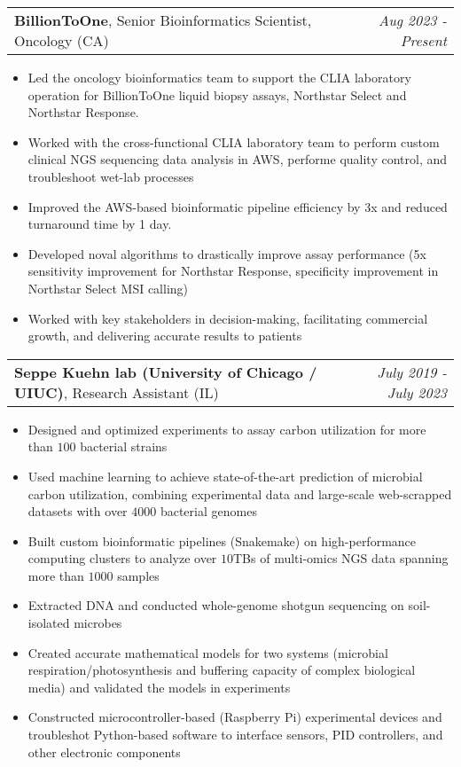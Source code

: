\documentclass[letterpaper,11pt]{article}
\makeatletter
\newcommand{\resumeItem}[2]{
  \item {#2\vspace{-2pt}} %
}
\newcommand{\resumeSubheading}[4]{
  \vspace{-1pt}\item[]
    \begin{tabular*}{0.97\textwidth}[t]{l@{\extracolsep{\fill}}r}
      \textbf{#1}, {#2} (#3) & \textit{#4} \\
    \end{tabular*}\vspace{-5pt}
}
\newcommand{\resumeItemListStart}{\begin{itemize}[leftmargin=*]} %
\newcommand{\resumeItemListEnd}{\end{itemize}\vspace{-5pt}}
\makeatother
\begin{document}
  \resumeSubheading
  {BillionToOne}{Senior Bioinformatics Scientist, Oncology}
  {CA}{Aug 2023 - Present}
    \resumeItemListStart
    \resumeItem{}{Led the oncology bioinformatics team to support the CLIA laboratory operation for BillionToOne liquid biopsy assays, Northstar Select and Northstar Response.}
    \resumeItem{}{Worked with the cross-functional CLIA laboratory team to perform custom clinical NGS sequencing data analysis in AWS, performe quality control, and troubleshoot wet-lab processes}
    \resumeItem{}{Improved the AWS-based bioinformatic pipeline efficiency by 3x and reduced turnaround time by 1 day.}
    \resumeItem{}{Developed noval algorithms to drastically improve assay performance (5x sensitivity improvement for Northstar Response, specificity improvement in Northstar Select MSI calling)}
    \resumeItem{}{Worked with key stakeholders in decision-making, facilitating commercial growth, and delivering accurate results to patients}
    \resumeItemListEnd
  \resumeSubheading
  {Seppe Kuehn lab (University of Chicago / UIUC)}{Research Assistant}
  {IL}{July 2019 - July 2023}
    \resumeItemListStart
    \resumeItem{Experimental design:}{Designed and optimized experiments to assay carbon utilization for more than $100$ bacterial strains}
    \resumeItem{Statistical modeling:}{Used machine learning to achieve state-of-the-art prediction of microbial carbon utilization, combining experimental data and large-scale web-scrapped datasets with over $4000$ bacterial genomes}
    \resumeItem{Bioinformatics:}{Built custom bioinformatic pipelines (Snakemake) on high-performance computing clusters to analyze over $10$TBs of multi-omics NGS data spanning more than $1000$ samples}
    \resumeItem{}{Extracted DNA and conducted whole-genome shotgun sequencing on soil-isolated microbes}
    \resumeItem{Theoretical modeling:}{Created accurate mathematical models for two systems (microbial respiration/photosynthesis and buffering capacity of complex biological media) and validated the models in experiments}
    \resumeItem{Hardware:}{Constructed microcontroller-based (Raspberry Pi) experimental devices and troubleshot Python-based software to interface sensors, PID controllers, and other electronic components}
    
    \resumeItemListEnd
\end{document}
